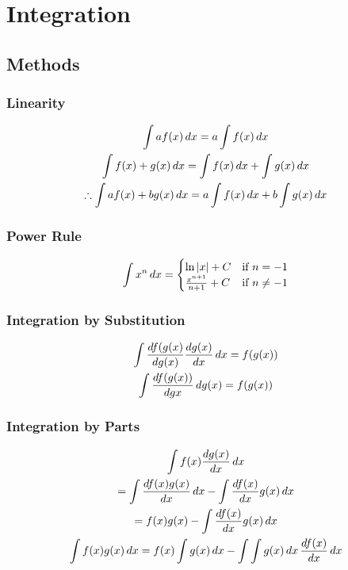 \documentclass[12pt]{article}
\numberwithin{equation}{subsubsection}
\begin{document}
	\section{Integration}
		\subsection{Methods}
			\subsubsection{Linearity}
				\begin{gather}
					\integral{af(x)} = a\integral{f(x)} \\
					\integral{f(x) + g(x)} = \integral{f(x)} +
					\integral{g(x)} \\
					\therefore \integral{af(x) + bg(x)} = a\integral{f(x)}
					+ b\integral{g(x)}
				\end{gather}
			\subsubsection{Power Rule}
				\begin{gather}
					\integral{x^n} =
						\begin{cases}
							\ln |x| + C & \text{if }
							n = -1 \\
							\frac{x^{n+1}}{n+1} + C
							& \text{if } n \neq -1
						\end{cases}
				\end{gather}
			\subsubsection{Integration by Substitution}
				\begin{gather}
					\integral{\derivative[g(x)]{f(g(x)}\derivative{g(x)}}
					= f(g(x)) \\
					\int
					\derivative[g{x}]{f(g(x))}\,dg(x) =
					f(g(x))
				\end{gather}
			\subsubsection{Integration by Parts}
				\begin{gather}
					\integral{f(x)\derivative{g(x)}} \\
					= \integral{\derivative{f(x)g(x)}} -
					\integral{\derivative{f(x)}g(x)} \\
					= f(x)g(x) - \integral{\derivative{f(x)}g(x)}
					\\
					\integral{f(x)g(x)} = f(x)\integral{g(x)}
					- \integral{\integral{g(x)}\,\derivative{f(x)}}
				\end{gather}
\end{document}
